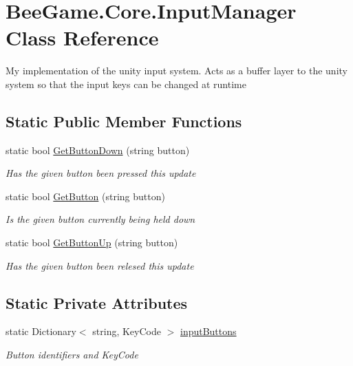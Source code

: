 \hypertarget{class_bee_game_1_1_core_1_1_input_manager}{}\section{Bee\+Game.\+Core.\+Input\+Manager Class Reference}
\label{class_bee_game_1_1_core_1_1_input_manager}


My implementation of the unity input system. Acts as a buffer layer to the unity system so that the input keys can be changed at runtime  


\subsection*{Static Public Member Functions}
\begin{DoxyCompactItemize}
\item 
static bool \hyperlink{class_bee_game_1_1_core_1_1_input_manager_ac90aab89652007118b67f60e962103c5}{Get\+Button\+Down} (string button)
\begin{DoxyCompactList}\small\item\em Has the given button been pressed this update \end{DoxyCompactList}\item 
static bool \hyperlink{class_bee_game_1_1_core_1_1_input_manager_a2bd5bb8dc1aaf482f50b9751037eb64c}{Get\+Button} (string button)
\begin{DoxyCompactList}\small\item\em Is the given button currently being held down \end{DoxyCompactList}\item 
static bool \hyperlink{class_bee_game_1_1_core_1_1_input_manager_a48509279629e2144c23c3d2a9dee4257}{Get\+Button\+Up} (string button)
\begin{DoxyCompactList}\small\item\em Has the given button been relesed this update \end{DoxyCompactList}\end{DoxyCompactItemize}
\subsection*{Static Private Attributes}
\begin{DoxyCompactItemize}
\item 
static Dictionary$<$ string, Key\+Code $>$ \hyperlink{class_bee_game_1_1_core_1_1_input_manager_ad0a5b4a5db00803c01ecb3431e208ca1}{input\+Buttons}
\begin{DoxyCompactList}\small\item\em Button identifiers and Key\+Code \end{DoxyCompactList}\end{DoxyCompactItemize}


